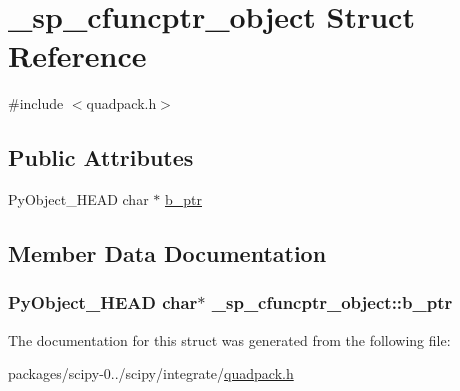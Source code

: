 \hypertarget{struct__sp__cfuncptr__object}{}\section{\+\_\+sp\+\_\+cfuncptr\+\_\+object Struct Reference}
\label{struct__sp__cfuncptr__object}


{\ttfamily \#include $<$quadpack.\+h$>$}

\subsection*{Public Attributes}
\begin{DoxyCompactItemize}
\item 
Py\+Object\+\_\+\+H\+E\+A\+D char $\ast$ \hyperlink{struct__sp__cfuncptr__object_a2a727aa0444d46ee9dad611b9b28888e}{b\+\_\+ptr}
\end{DoxyCompactItemize}


\subsection{Member Data Documentation}
\hypertarget{struct__sp__cfuncptr__object_a2a727aa0444d46ee9dad611b9b28888e}{}
\subsubsection[{b\+\_\+ptr}]{\setlength{\rightskip}{0pt plus 5cm}Py\+Object\+\_\+\+H\+E\+A\+D char$\ast$ \+\_\+sp\+\_\+cfuncptr\+\_\+object\+::b\+\_\+ptr}\label{struct__sp__cfuncptr__object_a2a727aa0444d46ee9dad611b9b28888e}


The documentation for this struct was generated from the following file\+:\begin{DoxyCompactItemize}
\item 
packages/scipy-\/0../scipy/integrate/\hyperlink{quadpack_8h}{quadpack.\+h}\end{DoxyCompactItemize}
